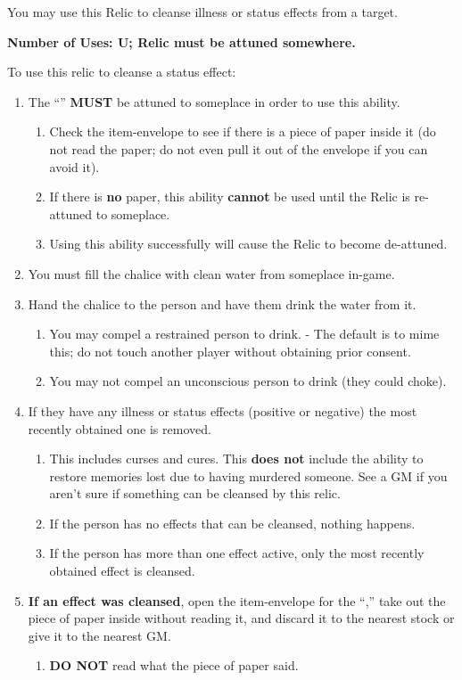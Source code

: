 \documentclass[green]{GL2020}
\begin{document}
\name{\gStatusCleanse{}}

You may use this Relic to cleanse illness or status effects from a target. 

\textbf{Number of Uses: U; Relic must be attuned somewhere.}

To use this relic to cleanse a status effect:
\begin{enumerate}
  \item The ``\iChalice{}'' \textbf{MUST} be attuned to someplace in order to use this ability.
  \begin{enumerate}
    \item Check the item-envelope to see if there is a piece of paper inside it (do not read the paper; do not even pull it out of the envelope if you can avoid it).
    \item If there is \textbf{no} paper, this ability \textbf{cannot} be used until the Relic is re-attuned to someplace.
    \item Using this ability successfully will cause the Relic to become de-attuned.
  \end{enumerate}
  \item You must fill the chalice with clean water from someplace in-game.
  \item Hand the chalice to the person and have them drink the water from it.
  \begin{enumerate}
    \item You may compel a restrained person to drink. - The default is to mime this; do not touch another player without obtaining prior consent.
    \item You may not compel an unconscious person to drink (they could choke).
  \end{enumerate}
  \item If they have any illness or status effects (positive or negative) the most recently obtained one is removed.
  \begin{enumerate}
    \item This includes curses and cures. This \textbf{does not} include the ability to restore memories lost due to having murdered someone. See a GM if you aren’t sure if something can be cleansed by this relic.
    \item If the person has no effects that can be cleansed, nothing happens.
    \item If the person has more than one effect active, only the most recently obtained effect is cleansed.
  \end{enumerate}
  \item \textbf{If an effect was cleansed}, open the item-envelope for the ``\iChalice{},'' take out the piece of paper inside without reading it, and discard it to the nearest stock or give it to the nearest GM.
  \begin{enumerate}
    \item \textbf{DO NOT} read what the piece of paper said.
  \end{enumerate}
\end{enumerate}
\end{document}
